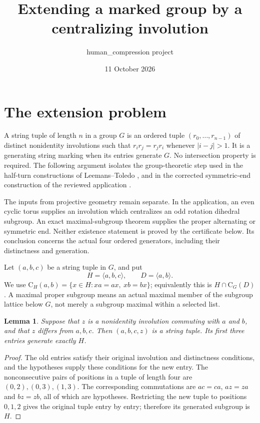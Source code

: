 \documentclass[11pt]{article}
\title{Extending a marked group by a centralizing involution}
\author{human\_compression project}
\date{11 October 2026}
\newtheorem{lemma}[theorem]{Lemma}
\newcommand{\gen}[1]{\langle #1\rangle}
\newcommand{\CG}{\mathrm C}
\begin{document}
\maketitle

\section{The extension problem}
A string tuple of length $n$ in a group $G$ is an ordered tuple
$(r_0,\ldots,r_{n-1})$ of distinct nonidentity involutions such that
$r_i r_j=r_j r_i$ whenever $|i-j|>1$. It is a generating string marking
when its entries generate $G$. No intersection property is required.
The following argument isolates the group-theoretic step used in the
half-turn constructions of Leemans--Toledo \cite[Theorem~4.4 and
Proposition~4.7]{LT}, and in the corrected symmetric-end construction
of the reviewed application \cite[Sections~5--7]{Application}.

The inputs from projective geometry remain separate. In the application,
an even cyclic torus supplies an involution which centralizes an odd
rotation dihedral subgroup. An exact maximal-subgroup theorem supplies
the proper alternating or symmetric end. Neither existence statement is
proved by the certificate below. Its conclusion concerns the actual four
ordered generators, including their distinctness and generation.

Let $(a,b,c)$ be a string tuple in $G$, and put
\[
 H=\gen{a,b,c},\qquad D=\gen{a,b}.
\]
We use $\CG_H(a,b)=\{x\in H:xa=ax,\ xb=bx\}$; equivalently this is
$H\cap\CG_G(D)$. A maximal proper subgroup means an actual maximal
member of the subgroup lattice below $G$, not merely a subgroup maximal
within a selected list.

\begin{lemma}\label{lem:tuple}
Suppose that $z$ is a nonidentity involution commuting with $a$ and $b$,
and that $z$ differs from $a,b,c$. Then $(a,b,c,z)$ is a string tuple.
Its first three entries generate exactly $H$.
\end{lemma}
\begin{proof}
The old entries satisfy their original involution and distinctness
conditions, and the hypotheses supply these conditions for the new
entry. The nonconsecutive pairs of positions in a tuple of length four
are $(0,2),(0,3),(1,3)$. The corresponding commutations are $ac=ca$,
$az=za$ and $bz=zb$, all of which are hypotheses. Restricting the new
tuple to positions $0,1,2$ gives the original tuple entry by entry;
therefore its generated subgroup is $H$.
\end{proof}
\end{document}
